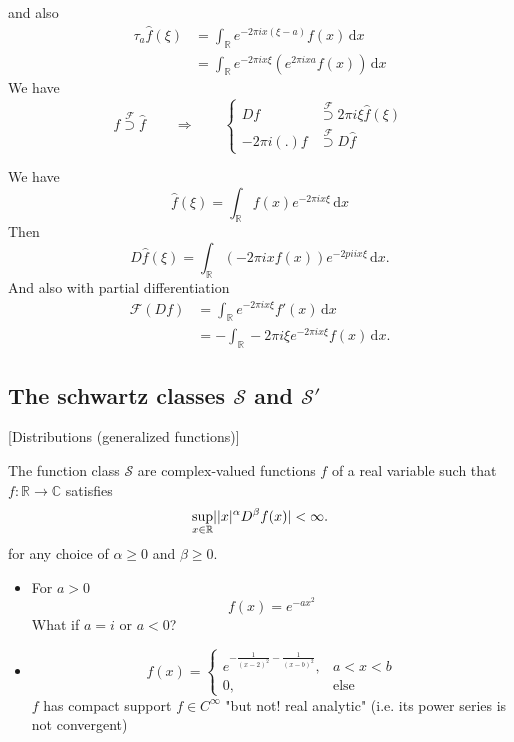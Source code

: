 and also
\begin{align*}
	\tau_a \hat{f}(\xi) &= \int_{\mathbb{R}}^{} e^{-2 \pi i x ( \xi - a )} f(x) \,\mathrm{d}x \\
	&= \int_{\mathbb{R}}^{} e^{-2 \pi i x \xi} \left( e^{2 \pi i x a }f(x) \right) \,\mathrm{d}x
\end{align*}
We have
\[
	f \stackrel{\mathcal{F}}{\supset} \hat{f} \qquad \Rightarrow \qquad \begin{cases}
		Df &\stackrel{\mathcal{F}}{\supset} 2 \pi i \xi \hat{f}(\xi) \\
		- 2 \pi i (.)f &\stackrel{\mathcal{F}}{\supset} D \hat{f}
	\end{cases}
\]
\begin{beweis}
	We have
	\[
		\hat{f}(\xi) = \int_{\mathbb{R}}^{} f(x) e^{-2 \pi i x \xi} \,\mathrm{d}x
	\]
	Then
	\[
		D \hat{f}(\xi) = \int_{\mathbb{R}}^{} \left( -2 \pi i x f(x) \right) e^{-2 pi i x \xi} \,\mathrm{d}x.
	\]
	And also with partial differentiation
	\begin{align*}
		\mathcal{F}(Df) &= \int_{\mathbb{R}}^{} e^{-2 \pi i x \xi} f'(x) \,\mathrm{d}x \\
		&= - \int_{\mathbb{R}}^{} - 2 \pi i \xi e^{-2 \pi i x \xi}f(x) \,\mathrm{d}x.
	\end{align*}
\end{beweis}
\subsection{The schwartz classes $\mathcal{S}$ and $\mathcal{S}'$} 
\label{sub:the_classes_mathcal_s_and_mathcal_s}
[Distributions (generalized functions)]

\begin{definition}
	The function class $\mathcal{S}$ are complex-valued functions $f$ of a real variable such that $f: \mathbb{R} \to \mathbb{C}$ satisfies
	\[
		\sup_{x \in \mathbb{R}} \lvert \lvert x\rvert^{\alpha} D^{\beta}f(x)\rvert < \infty.
	\]   
	for any choice of $\alpha \geq 0$ and $\beta \geq 0$.
\end{definition}
\begin{beispiele}
	\begin{itemize}
		\item For $a >0$ \[
		f(x) = e^{- a x^2}
	\]
	What if $a = i$ or $a <0$?
	\item \[
		f(x) = \begin{cases}
			e^{- \frac{1}{(x-2)^2} - \frac{1}{(x-b)^2}}, &a < x < b \\
			0, &\text{else}
		\end{cases}
	\]
	$f$ has compact support $f \in C^{\infty}$ "but not! real analytic" (i.e. its power series is not convergent)
	\end{itemize}
\end{beispiele}

